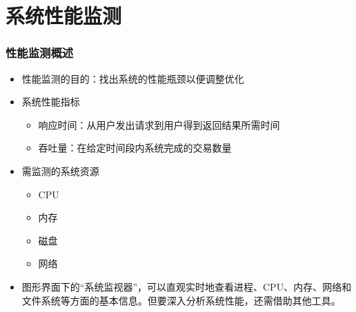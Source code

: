 \documentclass[xcolor=svgnames,presentation]{beamer}
\begin{document}
\section{系统性能监测}
\label{sec-5}
\begin{frame}
\frametitle{性能监测概述}
\label{sec-5-1}
\begin{itemize}

\item 性能监测的目的：找出系统的性能瓶颈以便调整优化
\label{sec-5-1-1}%

\item 系统性能指标
\label{sec-5-1-2}%
\begin{itemize}

\item 响应时间：从用户发出请求到用户得到返回结果所需时间
\label{sec-5-1-2-1}%

\item 吞吐量：在给定时间段内系统完成的交易数量
\label{sec-5-1-2-2}%
\end{itemize} %

\item 需监测的系统资源
\label{sec-5-1-3}%
\begin{itemize}

\item CPU
\label{sec-5-1-3-1}%

\item 内存
\label{sec-5-1-3-2}%

\item 磁盘
\label{sec-5-1-3-3}%

\item 网络
\label{sec-5-1-3-4}%
\end{itemize} %

\item 图形界面下的“系统监视器”，可以直观实时地查看进程、CPU、内存、网络和文件系统等方面的基本信息。但要深入分析系统性能，还需借助其他工具。
\label{sec-5-1-4}%
\end{itemize} %
\end{frame}
\end{document}
